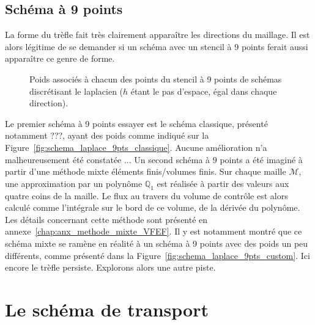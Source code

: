 \documentclass[main.tex]{subfiles}
\begin{document}
\subsection{Schéma à 9 points}
La forme du trèfle fait très clairement apparaître les directions du maillage. Il est alors légitime de se demander si un schéma avec un stencil à 9 points ferait aussi apparaître ce genre de forme. 
\begin{figure}[h]
\caption{\label{fig:schema_laplacien}Poids associés à chacun des points du stencil à 9 points de schémas discrétisant le laplacien ($h$ étant le pas d'espace, égal dans chaque direction).}
\end{figure}
Le premier schéma à 9 points essayer est le schéma classique, présenté notamment ???, ayant des poids comme indiqué sur la Figure~\ref{fig:schema_laplace_9pts_classique}. Aucune amélioration n'a malheureusement été constatée ... Un second schéma à 9 points a été imaginé à partir d'une méthode mixte éléments finis/volumes finis.
Sur chaque maille $\mathcal{M}$, une approximation par un polynôme $\mathbb{Q}_1$ est réalisée à partir des valeurs aux quatre coins de la maille. Le flux au travers du volume de contrôle est alors calculé comme l'intégrale sur le bord de ce volume, de la dérivée du polynôme. Les détails concernant cette méthode sont présenté en  annexe~\ref{chap:anx_methode_mixte_VFEF}. Il y est notamment montré que ce schéma mixte se ramène en réalité à un schéma à 9 points avec des poids un peu différents, comme présenté dans la Figure~\ref{fig:schema_laplace_9pts_custom}. 
Ici encore le trèfle persiste. Explorons alors une autre piste.

\section{Le schéma de transport}
\end{document}
